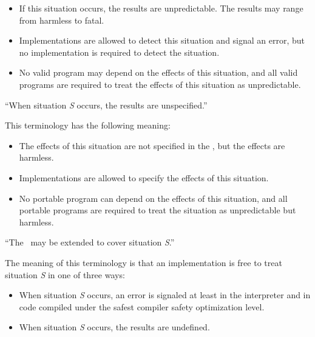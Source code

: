 \begin{flushdesc}
\begin{itemize}

\item  If this situation occurs, the results are unpredictable.  The
results may range from harmless to fatal.

\item  Implementations are allowed to detect this situation and
signal an error, but no implementation is required to detect the
situation.

\item  No valid program may depend on the effects of this
situation, and all valid programs are required to treat the effects 
of this situation as unpredictable.

\end{itemize}

\item[``When situation {\it S} occurs, the results are unspecified.'']

This terminology has the following meaning:

\nobreak
\begin{itemize}

\item  The effects of this situation are not specified in
the \OS, but the effects are harmless.

\item  Implementations are allowed to specify the effects of
this situation.

\item  No portable program can depend on the effects of this
situation, and all portable programs are required to treat the situation
as unpredictable but harmless.

\end{itemize}

\item[``The \CLOS\ may be extended to cover situation {\it S}.'']

The meaning of this terminology is that an implementation is free to treat
situation {\it S} in one of three ways:

\begin{itemize}

\item  When situation {\it S} occurs, an error is signaled at least
in the interpreter and in code compiled under the safest compiler
safety optimization level.

\item  When situation {\it S} occurs, the results are undefined.


\end{itemize}
\end{flushdesc}
